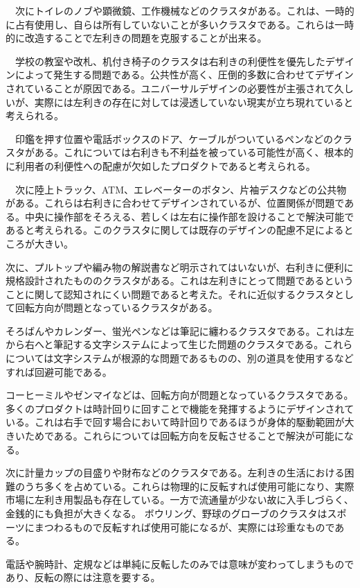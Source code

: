 \documentclass{jsarticle}
\begin{document}
　次にトイレのノブや顕微鏡、工作機械などのクラスタがある。これは、一時的に占有使用し、自らは所有していないことが多いクラスタである。これらは一時的に改造することで左利きの問題を克服することが出来る。

　学校の教室や改札、机付き椅子のクラスタは右利きの利便性を優先したデザインによって発生する問題である。公共性が高く、圧倒的多数に合わせてデザインされていることが原因である。ユニバーサルデザインの必要性が主張されて久しいが、実際には左利きの存在に対しては浸透していない現実が立ち現れていると考えられる。

　印鑑を押す位置や電話ボックスのドア、ケーブルがついているペンなどのクラスタがある。これについては右利きも不利益を被っている可能性が高く、根本的に利用者の利便性への配慮が欠如したプロダクトであると考えられる。

　次に陸上トラック、ATM、エレベーターのボタン、片袖デスクなどの公共物がある。これらは右利きに合わせてデザインされているが、位置関係が問題である。中央に操作部をそろえる、若しくは左右に操作部を設けることで解決可能であると考えられる。このクラスタに関しては既存のデザインの配慮不足によるところが大きい。

次に、プルトップや編み物の解説書など明示されてはいないが、右利きに便利に規格設計されたもののクラスタがある。これは左利きにとって問題であるということに関して認知されにくい問題であると考えた。それに近似するクラスタとして回転方向が問題となっているクラスタがある。

そろばんやカレンダー、蛍光ペンなどは筆記に纏わるクラスタである。これは左から右へと筆記する文字システムによって生じた問題のクラスタである。これらについては文字システムが根源的な問題であるものの、別の道具を使用するなどすれば回避可能である。

コーヒーミルやゼンマイなどは、回転方向が問題となっているクラスタである。多くのプロダクトは時計回りに回すことで機能を発揮するようにデザインされている。これは右手で回す場合において時計回りであるほうが身体的駆動範囲が大きいためである。これらについては回転方向を反転させることで解決が可能になる。

次に計量カップの目盛りや財布などのクラスタである。左利きの生活における困難のうち多くを占めている。これらは物理的に反転すれば使用可能になり、実際市場に左利き用製品も存在している。一方で流通量が少ない故に入手しづらく、金銭的にも負担が大きくなる。
ボウリング、野球のグローブのクラスタはスポーツにまつわるもので反転すれば使用可能になるが、実際には珍重なものである。

電話や腕時計、定規などは単純に反転したのみでは意味が変わってしまうものであり、反転の際には注意を要する。
\end{document}
